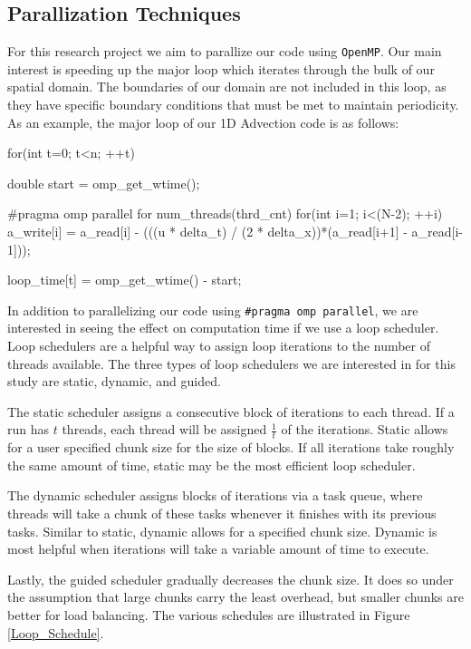 \documentclass{article}
\begin{document}
\subsection{Parallization Techniques}
For this research project we aim to parallize our code using \texttt{OpenMP}. Our main interest is speeding up the major loop which iterates through the bulk of our spatial domain. The boundaries of our domain are not included in this loop, as they have specific boundary conditions that must be met to maintain periodicity. As an example, the major loop of our 1D Advection code is as follows:

\begin{c++}
for(int t=0; t<n; ++t)  {
    double start = omp_get_wtime();

    #pragma omp parallel for num_threads(thrd_cnt)
    for(int i=1; i<(N-2); ++i)  {
        a_write[i] = a_read[i] - 
        (((u * delta_t) / (2 * delta_x))*(a_read[i+1] - a_read[i-1]));
    }
    	
    loop_time[t] = omp_get_wtime() - start;
}	
\end{c++}



In addition to parallelizing our code using \texttt{\#pragma omp parallel}, we are interested in seeing the effect on computation time if we use a loop scheduler. Loop schedulers are a helpful way to assign loop iterations to the number of threads available. The three types of loop schedulers we are interested in for this study are static, dynamic, and guided. 

The static scheduler assigns a consecutive block of iterations to each thread. If a run has $t$ threads, each thread will be assigned $\tfrac{1}{t}$ of the iterations. Static allows for a user specified chunk size for the size of blocks. If all iterations take roughly the same amount of time, static may be the most efficient loop scheduler.
 
 The dynamic scheduler assigns blocks of iterations via a task queue, where threads will take a chunk of these tasks whenever it finishes with its previous tasks. Similar to static, dynamic allows for a specified chunk size. Dynamic is most helpful when iterations will take a variable amount of time to execute.
 
 Lastly, the guided scheduler gradually decreases the chunk size. It does so under the assumption that large chunks carry the least overhead, but smaller chunks are better for load balancing. The various schedules are illustrated in Figure \ref{Loop_Schedule}.
 
\end{document}
